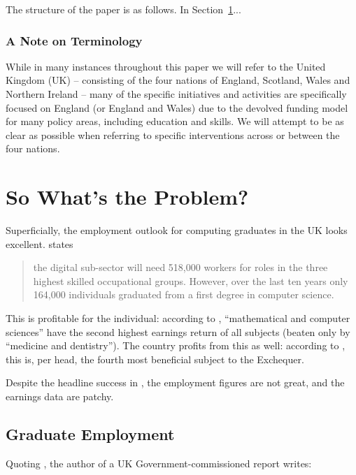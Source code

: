\documentclass[sigconf,anonymous]{acmart}
\begin{document}
The structure of the paper is as follows. In Section~\ref{problem}...


\subsubsection*{A Note on Terminology}

While in many instances throughout this paper we will refer to the
United Kingdom (UK) -- consisting of the four nations of England,
Scotland, Wales and Northern Ireland -- many of the specific
initiatives and activities are specifically focused on England (or
England and Wales) due to the devolved funding model for many policy
areas, including education and skills. We will attempt to be as clear
as possible when referring to specific interventions across or between
the four nations.

\section{So What's the Problem?}\label{problem}

Superficially, the employment outlook for computing graduates in the
UK looks excellent. \cite[p.~74]{UKCES2015b} states
\begin{quote} the digital sub-sector will need 518,000 workers for
roles in the three highest skilled occupational groups. However, over
the last ten years only 164,000 individuals graduated from a first
degree in computer science.
\end{quote} This is profitable for the individual: according to
\cite[Figure 4]{BIS2011a}, ``mathematical and computer sciences'' have
the second highest earnings return of all subjects (beaten only by
``medicine and dentistry'').  The country profits from this as well:
according to \cite[p.~16]{BIS2011a}, this is, per head, the fourth
most beneficial subject to the Exchequer.

Despite the headline success in \cite{BIS2011a}, the employment
figures are not great, and the earnings data are patchy.

\subsection{Graduate Employment}

Quoting \cite{UKCES2015b}, the author of a UK Government-commissioned
report \cite{Shadbolt2016a} writes:
\end{document}
